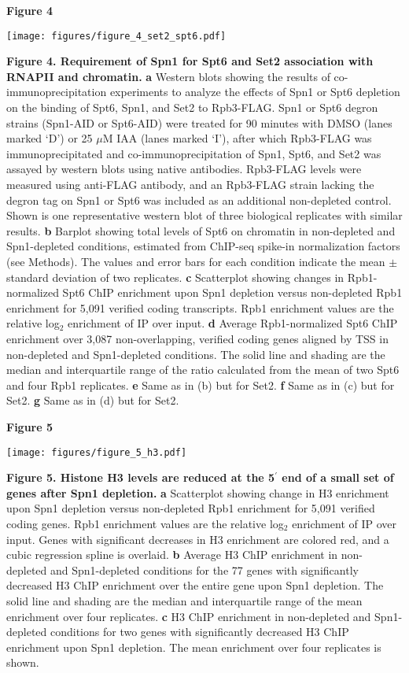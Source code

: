 \documentclass[8pt]{extarticle}
\begin{document}
\newpage

\textbf{\large Figure 4}

\texttt{[image: figures/figure\_4\_set2\_spt6.pdf]}

\vspace{2em}
\textbf{Figure 4. Requirement of Spn1 for Spt6 and Set2 association with RNAPII and chromatin.}
\textbf{a} Western blots showing the results of co-immunoprecipitation experiments to analyze the effects of Spn1 or Spt6 depletion on the binding of Spt6, Spn1, and Set2 to Rpb3-FLAG.
Spn1 or Spt6 degron strains (Spn1-AID or Spt6-AID) were treated for 90 minutes with DMSO (lanes marked `D') or 25 $\mu$M IAA (lanes marked `I'), after which Rpb3-FLAG was immunoprecipitated and co-immunoprecipitation of Spn1, Spt6, and Set2 was assayed by western blots using native antibodies.
Rpb3-FLAG levels were measured using anti-FLAG antibody, and an Rpb3-FLAG strain lacking the degron tag on Spn1 or Spt6 was included as an additional non-depleted control.
Shown is one representative western blot of three biological replicates with similar results.
\textbf{b} Barplot showing total levels of Spt6 on chromatin in non-depleted and Spn1-depleted conditions, estimated from ChIP-seq spike-in normalization factors (see Methods).
The values and error bars for each condition indicate the mean $\pm$ standard deviation of two replicates.
\textbf{c} Scatterplot showing changes in Rpb1-normalized Spt6 ChIP enrichment upon Spn1 depletion versus non-depleted Rpb1 enrichment for 5,091 verified coding transcripts.
Rpb1 enrichment values are the relative log$_2$ enrichment of IP over input.
\textbf{d} Average Rpb1-normalized Spt6 ChIP enrichment over 3,087 non-overlapping, verified coding genes aligned by TSS in non-depleted and Spn1-depleted conditions.
The solid line and shading are the median and interquartile range of the ratio calculated from the mean of two Spt6 and four Rpb1 replicates.
\textbf{e} Same as in (b) but for Set2.
\textbf{f} Same as in (c) but for Set2.
\textbf{g} Same as in (d) but for Set2.

\newpage

\textbf{\large Figure 5}

\texttt{[image: figures/figure\_5\_h3.pdf]}

\vspace{2em}
\textbf{Figure 5. Histone H3 levels are reduced at the 5$^\prime$ end of a small set of genes after Spn1 depletion.}
\textbf{a} Scatterplot showing change in H3 enrichment upon Spn1 depletion versus non-depleted Rpb1 enrichment for 5,091 verified coding genes.
Rpb1 enrichment values are the relative log$_2$ enrichment of IP over input.
Genes with significant decreases in H3 enrichment are colored red, and a cubic regression spline is overlaid.
\textbf{b} Average H3 ChIP enrichment in non-depleted and Spn1-depleted conditions for the 77 genes with significantly decreased H3 ChIP enrichment over the entire gene upon Spn1 depletion.
The solid line and shading are the median and interquartile range of the mean enrichment over four replicates.
\textbf{c} H3 ChIP enrichment in non-depleted and Spn1-depleted conditions for two genes with significantly decreased H3 ChIP enrichment upon Spn1 depletion.
The mean enrichment over four replicates is shown.
\end{document}
